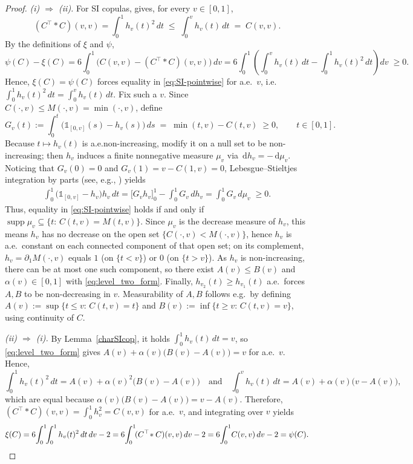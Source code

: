\documentclass{article}
\newcommand{\1}{\mathds{1}}
\newcommand{\de}{\mathrm{\,d}}
\begin{document}
\begin{proof}
\emph{(i) $\Rightarrow$ (ii).}
For SI copulas, \cite[Thm.~4.2]{siburg2021stochastic} gives, for every $v\in[0,1]$,
\begin{equation}\label{eq:SI-pointwise}
 (C^\top\!\ast C)(v,v)=\int_0^1 h_v(t)^2\,dt \;\le\; \int_0^v h_v(t)\,dt \;=\; C(v,v).
\end{equation}
By the definitions of $\xi$ and $\psi$,
\[
\psi(C)-\xi(C)
=6\int_0^1 \!\Big(C(v,v)-(C^\top\!\ast C)(v,v)\Big)\,dv
=6\int_0^1\!\left(\int_0^v h_v(t)\,dt-\int_0^1 h_v(t)^2\,dt\right)dv\;\ge 0.
\]
Hence, $\xi(C)=\psi(C)$ forces equality in \eqref{eq:SI-pointwise} for a.e.\ $v$, i.e.~\(
  \int_0^1 h_v(t)^2\,dt=\int_0^v h_v(t)\,dt .
\)
Fix such a $v$.
Since $C(\cdot,v)\le M(\cdot,v)=\min(\cdot,v)$, define
\[
  G_v(t):=\int_0^t \bigl(\1_{[0,v]}(s)-h_v(s)\bigr)\,ds
  \;=\;\min(t,v)-C(t,v)\;\ge0,\qquad t\in[0,1].
\]
Because $t\mapsto h_v(t)$ is a.e.\;non-increasing, modify it on a null set to be non-increasing; then $h_v$ induces a finite nonnegative measure $\mu_v$ via $\de h_v=-\de\mu_v$.
Noticing that $G_v(0)=0$ and $G_v(1)=v-C(1,v)=0$, Lebesgue--Stieltjes integration by parts (see, e.g., \cite[Thm.~21.67 (iv)]{hewitt1975real}) yields
\begin{align}\label{eq:ibp}
  \int_0^1 \bigl(\1_{[0,v]}-h_v\bigr)h_v\,dt
  = \Big[G_vh_v\Big]_{0}^{1} - \int_0^1 G_v\,dh_v
  = \int_0^1 G_v\,d\mu_v \;\ge 0.
\end{align}
Thus, equality in \eqref{eq:SI-pointwise} holds if and only if
\(
  \operatorname{supp}\mu_v \subseteq \{t:\,C(t,v)=M(t,v)\}.
\)
Since $\mu_v$ is the decrease measure of $h_v$, this means $h_v$ has no decrease on the open set $\{C(\cdot,v)<M(\cdot,v)\}$, hence $h_v$ is a.e.\ constant on each connected component of that open set; on its
complement, $h_v=\partial_1 M(\cdot,v)$ equals $1$ (on $\{t<v\}$) or $0$ (on $\{t>v\}$).
As $h_v$ is non-increasing, there can be at most one such component, so there exist $A(v)\le B(v)$ and $\alpha(v)\in[0,1]$ with \eqref{eq:level_two_form}.
Finally, $h_{v_2}(t)\ge h_{v_1}(t)$ a.e.~forces $A,B$ to be non-decreasing in $v$.
Measurability of $A,B$ follows e.g.\ by defining
$A(v):=\sup\{t\le v:\,C(t,v)=t\}$ and $B(v):=\inf\{t\ge v:\,C(t,v)=v\}$, using continuity of $C$.

\smallskip
\emph{(ii) $\Rightarrow$ (i).}
By Lemma~\ref{charSIcop}, it holds $\int_0^1 h_v(t)\,dt=v$, so \eqref{eq:level_two_form} gives
\(
A(v)+\alpha(v)\bigl(B(v)-A(v)\bigr)=v
\)
for a.e.\ $v$.
Hence,
\[
\int_0^1 h_v(t)^2\,dt = A(v)+\alpha(v)^2\bigl(B(v)-A(v)\bigr)
\quad\text{and}\quad
\int_0^v h_v(t)\,dt = A(v)+\alpha(v)\bigl(v-A(v)\bigr),
\]
which are equal because $\alpha(v)\bigl(B(v)-A(v)\bigr)=v-A(v)$.
Therefore, $(C^\top\!\ast C)(v,v)=\int_0^1 h_v^2=C(v,v)$ for a.e.\ $v$, and integrating over $v$ yields
\[
\xi(C)=6\!\int_0^1\!\!\int_0^1 h_v(t)^2\,dt\,dv-2
=6\!\int_0^1\!(C^\top\!\ast C)(v,v)\,dv-2
=6\!\int_0^1\! C(v,v)\,dv-2
=\psi(C).\qedhere
\]
\end{proof}
\end{document}
